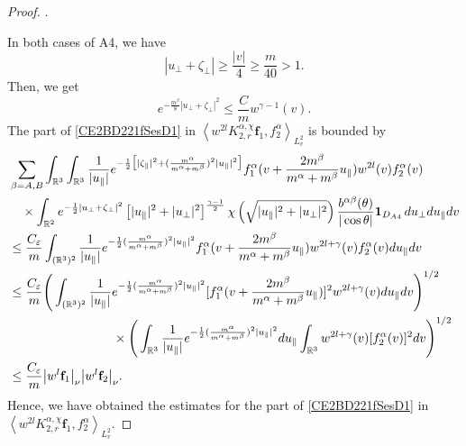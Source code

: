 \documentclass[reqno]{amsart}
\numberwithin{equation}{section}
\numberwithin{equation}{section}
\begin{document}
\begin{proof}
		
		.
		
		In both cases of A4,  we have
		\begin{equation*}
			|u_{\perp} + \zeta_{\perp}|\geq \frac{|v|}{4} \geq \frac{m}{40}>1.
		\end{equation*}
		Then, we get 
		\begin{equation}\label{LifA4}
			e^{-\frac{m^\beta}{8}|u_{\perp} + \zeta_{\perp}|^2}\leq \frac{C}{m}w^{\gamma-1} (v).
		\end{equation}
		The part of \eqref{CE2BD221fSesD1} in $\left \langle  w^{2l}K_{2,r}^{\alpha,\chi}\mathbf{f}_1,f^{\alpha}_2\right \rangle_{L^{2}_{v}}$ is bounded by 
		\begin{align*}
			& \sum_{\beta=A,B}\int_{\mathbb{R}^3}\int_{\mathbb{R}^3} \frac{1}{|u_{\parallel}|} e^{-\frac{1}{2}\big[|\zeta_{\parallel}|^2+(\frac{m^\alpha}{m^\alpha+m^\beta})^2|u_{\parallel}|^2\big]} f^\alpha_1(v + \frac{2m^{\beta}}{m^{\alpha}+m^{\beta}}u_{\parallel}) w^{2l}(v)f^\alpha_2(v)\\
			&\quad \times \int_{\mathbb{R}^2} e^{-\frac{1}{2}|u_{\perp} + \zeta_{\perp}|^2} \left[|u_{\parallel}|^2 + |u_{\perp}|^2\right]^{\frac{\gamma - 1}{2}} \chi\left(\sqrt{|u_{\parallel}|^2 + |u_{\perp}|^2}\right) \frac{b^{ \alpha \beta}(\theta)}{|\cos \theta|}\mathbf{1}_{D_{A4}} \, du_{\perp} du_{\parallel}dv\\
			&\leq \frac{C_\varepsilon}{m} \int_{(\mathbb{R}^3)^2}\frac{1}{|u_{\parallel}|}e^{-\frac{1}{2}(\frac{m^\alpha}{m^\alpha+m^\beta})^2|u_{\parallel}|^2}f^\alpha_1(v + \frac{2m^{\beta}}{m^{\alpha}+m^{\beta}}u_{\parallel}) w^{2l+\gamma}(v)f^\alpha_2(v)du_{\parallel}dv\\
			&\leq \frac{C_\varepsilon}{m} \Bigg(\int_{(\mathbb{R}^3)^2}\frac{1}{|u_{\parallel}|}e^{-\frac{1}{2}(\frac{m^\alpha}{m^\alpha+m^\beta})^2|u_{\parallel}|^2}[f^\alpha_1(v + \frac{2m^{\beta}}{m^{\alpha}+m^{\beta}}u_{\parallel})]^{2} w^{2l+\gamma}(v)du_{\parallel}dv\Bigg)^{1/2}\\
			&\hspace{2.9cm}\times  \Bigg(\int_{\mathbb{R}^3}\frac{1}{|u_{\parallel}|}e^{-\frac{1}{2}(\frac{m^\alpha}{m^\alpha+m^\beta})^2|u_{\parallel}|^2} du_{\parallel}\int_{\mathbb{R}^3}w^{2l+\gamma}(v)[f^\alpha_2(v)]^2dv\Bigg)^{1/2}\notag\\
			&\leq \frac{C_\varepsilon}{m} \big|w^{l}\mathbf{f}_1\big|_\nu \big|w^{l} \mathbf{f}_2\big|_\nu.
		\end{align*}
		Hence, we have obtained  the estimates for the part of \eqref{CE2BD221fSesD1} in $\left \langle  w^{2l}K_{2,r}^{\alpha,\chi}\mathbf{f}_1,f^{\alpha}_2\right \rangle_{L^{2}_{v}}$.


\end{proof}
\end{document}
